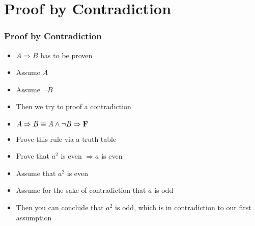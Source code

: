 \documentclass{beamer}
\theoremstyle{remark}
\begin{document}
\section{Proof by Contradiction}
\begin{frame}
\frametitle{Proof by Contradiction}
\begin{itemize}
	\item $A \Rightarrow B$ has to be proven	
	\pause
	\item Assume $A$
	\pause
	\item Assume $\lnot B$
	\pause
	\item Then we try to proof a contradiction
	\pause
	\item $A \Rightarrow B \equiv A \land \lnot B \Rightarrow \text{{\bf F}}$
	\pause
	\item Prove this rule via a truth table
\end{itemize}
\pause
\begin{example}
\begin{itemize}
	\item Prove that $a^2$ is even $\Rightarrow a$ is even
	\item Assume that $a^2$ is even
	\item Assume for the sake of contradiction that $a$ is odd
	\item Then you can conclude that $a^2$ is odd, which is in contradiction to our first assumption
\end{itemize}
\end{example}
\end{frame}
\end{document}
